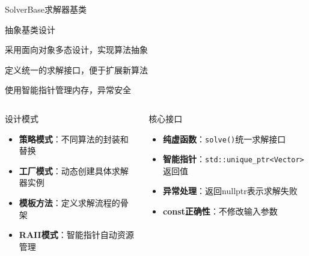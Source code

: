 \documentclass[UTF8,aspectratio=169]{beamer}
\begin{document}
\begin{frame}{SolverBase求解器基类}
    \begin{ytublock}{抽象基类设计}
        \item 采用面向对象多态设计，实现算法抽象
        \item 定义统一的求解接口，便于扩展新算法
        \item 使用智能指针管理内存，异常安全
    \end{ytublock}

    \begin{columns}
        \begin{block}{设计模式}
            \begin{itemize}
                \item \textbf{策略模式}：不同算法的封装和替换
                \item \textbf{工厂模式}：动态创建具体求解器实例
                \item \textbf{模板方法}：定义求解流程的骨架
                \item \textbf{RAII模式}：智能指针自动资源管理
            \end{itemize}
        \end{block}

        \begin{block}{核心接口}
            \begin{itemize}
                \item \textbf{纯虚函数}：\texttt{solve()}统一求解接口
                \item \textbf{智能指针}：\texttt{std::unique\_ptr<Vector>}返回值
                \item \textbf{异常处理}：返回nullptr表示求解失败
                \item \textbf{const正确性}：不修改输入参数
            \end{itemize}
        \end{block}
    \end{columns}
\end{frame}
\end{document}
